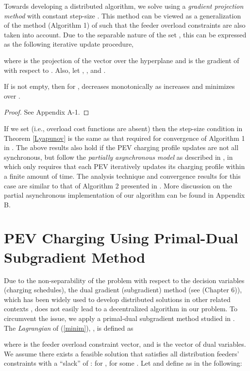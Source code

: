 \documentclass[12pt,draftcls,onecolumn]{IEEEtran}
\begin{document}
Towards developing a distributed algorithm, we solve  using a \textit{gradient projection method} with constant step-size . This method can be viewed as a generalization of the method (Algorithm 1) of \cite{GTL13} such that the feeder overload constraints are also taken into account. Due to the separable nature of the set , this can be expressed as the following iterative update procedure,

where  is the projection of the vector  over the hyperplane  and  is the gradient of  with respect to .
Also, let , , and .
\begin{Thm}
If  is not empty, then for ,  decreases monotonically as  increases and  minimizes  over .\\
\label{Lyapunov}
\end{Thm}
\begin{proof}
See Appendix A-1.
\end{proof}
If we set  (i.e., overload cost functions are absent) then the step-size condition in Theorem \ref{Lyapunov} is the same as that required for convergence of Algorithm 1 in \cite{GTL13}. The above results also hold if the PEV charging profile updates are not all synchronous, but follow the \textit{partially asynchronous model} as described in \cite{BT89}, in which only requires that each PEV iteratively updates its charging profile within a finite amount of time. The analysis technique and convergence results for this case are similar to that of Algorithm 2 presented in \cite{GTL13}. More discussion on the partial asynchronous implementation of our algorithm can be found in Appendix B.
\section{PEV Charging Using Primal-Dual Subgradient Method}\label{sec:primal-dual}
Due to the non-separability of the problem with respect to the decision variables (charging schedules), the dual gradient (subgradient) method (see \cite{B99} (Chapter 6)), which has been widely used to develop distributed solutions in other related contexts \cite{KMT98, LL99}, does not easily lead to a decentralized algorithm in our problem. To circumvent the issue, we apply a primal-dual subgradient method studied in \cite{NO09,Z92}.\\
The \emph{Lagrangian} of (\ref{minim}), , is defined as

where  is the feeder overload constraint vector, and  is the vector of dual variables. We assume there exists a feasible solution   that satisfies all distribution feeders\rq{} constraints with a ``slack'' of :  for , for some . Let  and define  as in the following:
\end{document}

